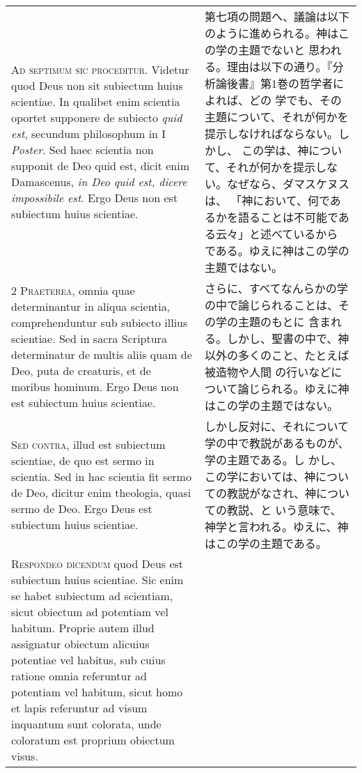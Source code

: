 \documentclass[10pt]{jsarticle}
\begin{document}
\begin{longtable}{p{21em}p{21em}}


{\Huge A}{\scshape d septimum sic proceditur}. Videtur quod Deus non
sit subiectum huius scientiae. In qualibet enim scientia oportet
supponere de subiecto {\itshape quid est}, secundum philosophum in I
{\itshape Poster}. Sed haec scientia non supponit de Deo quid est,
dicit enim Damascenus, {\itshape in Deo quid est, dicere impossibile
est}. Ergo Deus non est subiectum huius scientiae.


&

第七項の問題へ、議論は以下のように進められる。神はこの学の主題でないと
思われる。理由は以下の通り。『分析論後書』第1巻の哲学者によれば、どの
学でも、その主題について、それが何かを提示しなければならない。しかし、
この学は、神について、それが何かを提示しない。なぜなら、ダマスケヌスは、
「神において、何であるかを語ることは不可能である云々」と述べているから
である。ゆえに神はこの学の主題ではない。


\\


{\scshape 2 Praeterea}, omnia quae determinantur in aliqua scientia,
comprehenduntur sub subiecto illius scientiae. Sed in sacra Scriptura
determinatur de multis aliis quam de Deo, puta de creaturis, et de
moribus hominum. Ergo Deus non est subiectum huius scientiae.


&

さらに、すべてなんらかの学の中で論じられることは、その学の主題のもとに
含まれる。しかし、聖書の中で、神以外の多くのこと、たとえば被造物や人間
の行いなどについて論じられる。ゆえに神はこの学の主題ではない。


\\


{\scshape Sed contra}, illud est subiectum scientiae, de quo est sermo
in scientia. Sed in hac scientia fit sermo de Deo, dicitur enim
theologia, quasi sermo de Deo. Ergo Deus est subiectum huius
scientiae.


&


しかし反対に、それについて学の中で教説があるものが、学の主題である。し
かし、この学においては、神についての教説がなされ、神についての教説、と
いう意味で、神学と言われる。ゆえに、神はこの学の主題である。



\\


{\scshape Respondeo dicendum} quod Deus est subiectum huius
scientiae. Sic enim se habet subiectum ad scientiam, sicut obiectum ad
potentiam vel habitum. Proprie autem illud assignatur obiectum
alicuius potentiae vel habitus, sub cuius ratione omnia referuntur ad
potentiam vel habitum, sicut homo et lapis referuntur ad visum
inquantum sunt colorata, unde coloratum est proprium obiectum visus.




\end{longtable}
\end{document}
